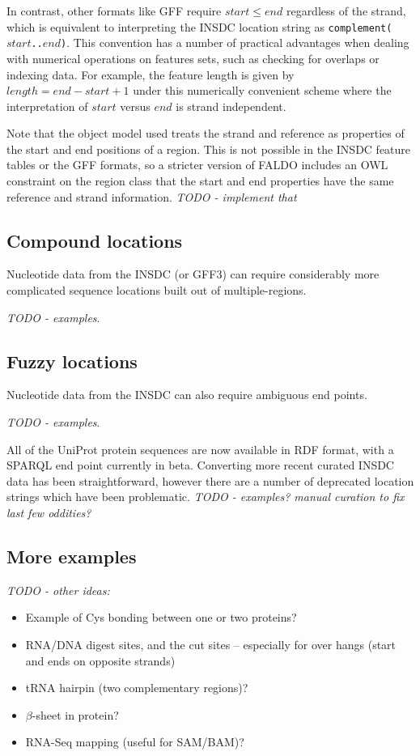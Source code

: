 In contrast, other formats like GFF require $start \leq end$
regardless of the strand, which is equivalent to interpreting
the INSDC location string as \texttt{complement($start$..$end$)}.
This convention has a number of practical advantages when
dealing with numerical operations on features sets, such as
checking for overlaps or indexing data. For example, the
feature length is given by $length = end - start + 1$ under
this numerically convenient scheme where the interpretation
of $start$ versus $end$ is strand independent.

Note that the object model used treats the strand and reference
as properties of the start and end positions of a region. This is
not possible in the INSDC feature tables or the GFF formats,
so a stricter version of FALDO includes an OWL constraint
on the region class that the start and end properties have
the same reference and strand information.
\textit{TODO - implement that}

\subsection{Compound locations}
Nucleotide data from the INSDC (or GFF3) can require considerably
more complicated sequence locations built out of multiple-regions.

\textit{TODO - examples}.

\subsection{Fuzzy locations}
Nucleotide data from the INSDC can also require ambiguous end points.

\textit{TODO - examples}.

All of the UniProt protein sequences are now available in RDF format,
with a SPARQL end point currently in beta. Converting more recent
curated INSDC data has been straightforward, however there are a
number of deprecated location strings which have been problematic.
\textit{TODO - examples? manual curation to fix last few oddities?}

\subsection{More examples}

\textit{TODO - other ideas:}
\begin{itemize}
\item Example of Cys bonding between one or two proteins?
\item RNA/DNA digest sites, and the cut sites -- especially for over hangs (start and ends on opposite strands)
\item tRNA hairpin (two complementary regions)?
\item $\beta$-sheet in protein?
\item RNA-Seq mapping (useful for SAM/BAM)?
\end{itemize}
